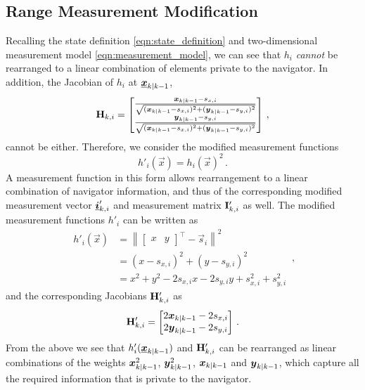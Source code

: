 \documentclass[10pt,letterpaper,oneside,twocolumn,journal]{IEEEtran}
\theoremstyle{definition}
\theoremstyle{definition}
\theoremstyle{remark}
\begin{document}
\subsection{Range Measurement Modification} \label{subsec:range_measurement_mod}


Recalling the state definition \eqref{eqn:state_definition} and two-dimensional measurement model \eqref{eqn:measurement_model}, we can see that $h_i$ \textit{cannot} be rearranged to a linear combination of elements private to the navigator. In addition, the Jacobian of $h_i$ at ${\boldsymbol{\underline{x}}}_{k|k-1}$,
\begin{equation}
    {\ensuremath{{\mathbf{H}}}}_{k,i} = 
    \begin{bmatrix}
        \frac{{\boldsymbol{x}}_{k|k-1} - s_{x,i}}{\sqrt{({\boldsymbol{x}}_{k|k-1} - s_{x,i})^2 + ({\boldsymbol{y}}_{k|k-1} - s_{y,i})^2}} \\
        \frac{{\boldsymbol{y}}_{k|k-1} - s_{y,i}}{\sqrt{({\boldsymbol{x}}_{k|k-1} - s_{x,i})^2 + ({\boldsymbol{y}}_{k|k-1} - s_{y,i})^2}} 
    \end{bmatrix}\,,
\end{equation}
cannot be either. Therefore, we consider the modified measurement functions
\begin{equation}
    h'_i(\vec{x}) = h_i(\vec{x})^2\,. \label{eqn:modified_measurement_func}
\end{equation}
A measurement function in this form allows rearrangement to a linear combination of navigator information, and thus of the corresponding modified measurement vector ${\boldsymbol{\underline{i}}}'_{k,i}$ and measurement matrix ${{\mathbf{I}}}'_{k,i}$ as well. The modified measurement functions $h'_i$ can be written as
\begin{equation}
    \begin{split}
        h'_i(\vec{x}) &= \left\lVert
        \begin{bmatrix}
            x & y
        \end{bmatrix}^\top - \vec{s}_i\right\rVert^2 \\
        &= (x - s_{x,i})^2 + (y - s_{y,i})^2 \\
        &= x^2 + y^2 -2s_{x,i}x -2s_{y,i}y +s_{x,i}^2 +s_{y,i}^2
    \end{split}\,,
\end{equation}
and the corresponding Jacobians ${{\mathbf{H}}}'_{k,i}$ as
\begin{equation}
    \mat{H}'_{k,i} = 
    \begin{bmatrix}
        2\rv{x}_{k|k-1} - 2s_{x,i} \\
        2\rv{y}_{k|k-1} - 2s_{y,i}
    \end{bmatrix}\,. \label{eqn:modified_jacobian}
\end{equation}
From the above we see that $h'_i({\boldsymbol{\underline{x}}}_{k|k-1})$ and ${{\mathbf{H}}}'_{k,i}$ can be rearranged as linear combinations of the weights ${\boldsymbol{x}}_{k|k-1}^2$, ${\boldsymbol{y}}_{k|k-1}^2$, ${\boldsymbol{x}}_{k|k-1}$ and ${\boldsymbol{y}}_{k|k-1}$, which capture all the required information that is private to the navigator. 
\end{document}
